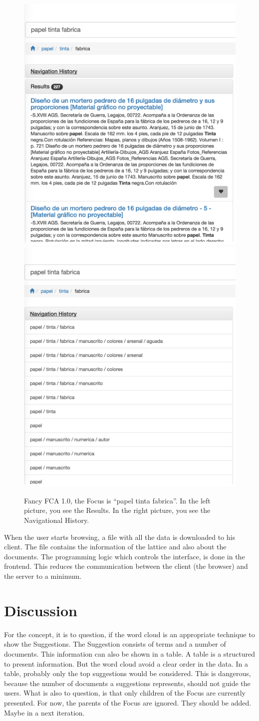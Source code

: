 \documentclass[11pt]{report}
\begin{document}
\begin{figure}[!ht]
\includegraphics[width=.48\linewidth]{images/fancy4}\hfill
\includegraphics[width=.48\linewidth]{images/fancy3}
\caption{Fancy FCA 1.0, the Focus is ``papel tinta fabrica''. In the left picture, you see the Results. In the right picture, you see the Navigational History.}
\label{figure:fancy3}
\end{figure}

When the user starts browsing, a  file with all the data is downloaded to his client. The file contains the information of the lattice and also about the documents. The programming logic which controls the interface, is done in the frontend. This reduces the communication between the client (the browser) and the server to a minimum.

\section{Discussion}

For the concept, it is to question, if the word cloud is an appropriate technique to show the Suggestions. The Suggestion consists of terms and a number of documents. This information can also be shown in a table. A table is a structured to present information. But the word cloud avoid a clear order in the data. In a table, probably only the top suggestions would be considered. This is dangerous, because the number of documents a suggestions represents, should not guide the users. What is also to question, is that only children of the Focus are currently presented. For now, the parents of the Focus are ignored. They should be added. Maybe in a next iteration.\\
\end{document}
